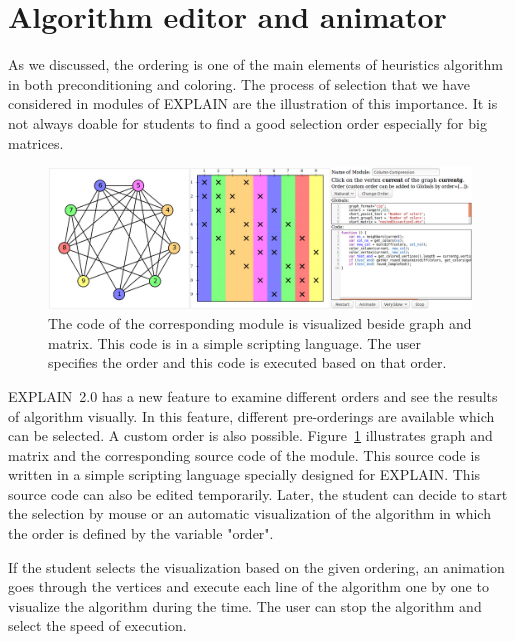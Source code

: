 \documentclass[12pt, twoside,a4paper,toc=bibliography]{scrbook}
\begin{document}
\section{Algorithm editor and animator}
\label{s.alg.edit}
As we discussed, the ordering is one of the main elements of heuristics algorithm
in both preconditioning and coloring. The process of selection that we have
considered in modules of \mbox{EXPLAIN} are the illustration of this importance.
It is not always doable for students to find a good selection order especially for
big matrices.
\begin{figure}
\centering
\includegraphics[width=\textwidth]{custom_module}
\caption{The code of the corresponding module is visualized beside
graph and matrix. This code is in a simple scripting language.
The user specifies the order and this code is executed based on that order.}
\label{f.custom_module}
\end{figure}

\mbox{EXPLAIN 2.0} has a new feature to examine different orders
and see the results of algorithm visually. In this feature, different
pre-orderings are available which can be selected. A custom order is
also possible. Figure~\ref{f.custom_module} illustrates graph and matrix
and the corresponding source code of the module. This source code
is written in a simple scripting language specially designed for \mbox{EXPLAIN}.
This source code can also be edited temporarily. Later, the student can
decide to start the selection by mouse or an automatic visualization
of the algorithm in which the order is defined by the variable "order".

If the student selects the visualization based on the given ordering,
an animation goes through the vertices and execute each line of the algorithm
one by one to visualize the algorithm during the time.
The user can stop the algorithm and select the speed of execution.
\end{document}
